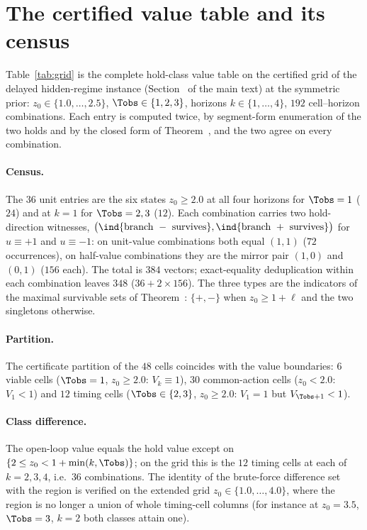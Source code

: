 \section{The certified value table and its census}\label{si:grid}

Table~\ref{tab:grid} is the complete hold-class value table on the certified grid of the delayed hidden-regime instance (Section~ of the main text) at the symmetric prior: $z_0\in\{1.0,\dots,2.5\}$, $\Tobs\in\{1,2,3\}$, horizons $k\in\{1,\dots,4\}$, $192$ cell--horizon combinations. Each entry is computed twice, by segment-form enumeration of the two holds and by the closed form  of Theorem~, and the two agree on every combination.

\begin{table}[h]
\centering\footnotesize
\caption{Hold-class safety value $V^{\hold}_k(b_0)$ on the certified grid at $w=\tfr12$. The value is $1$ exactly when $z_0\ge1+\min(k,\Tobs)$: $36$ unit entries and $156$ half entries.}
\label{tab:grid}
\setlength{\tabcolsep}{4pt}

\end{table}

\paragraph{Census.} The $36$ unit entries are the six states $z_0\ge2.0$ at all four horizons for $\Tobs=1$ ($24$) and at $k=1$ for $\Tobs=2,3$ ($12$). Each combination carries two hold-direction witnesses, $\bigl(\ind{\text{branch }-\text{ survives}},\ind{\text{branch }+\text{ survives}}\bigr)$ for $u\equiv+1$ and $u\equiv-1$: on unit-value combinations both equal $(1,1)$ ($72$ occurrences), on half-value combinations they are the mirror pair $(1,0)$ and $(0,1)$ ($156$ each). The total is $384$ vectors; exact-equality deduplication within each combination leaves $348$ ($36+2\times156$). The three types are the indicators of the maximal survivable sets of Theorem~: $\{+,-\}$ when $z_0\ge1+\ell$ and the two singletons otherwise.

\paragraph{Partition.} The certificate partition of the $48$ cells coincides with the value boundaries: $6$ viable cells ($\Tobs=1$, $z_0\ge2.0$: $V_k\equiv1$), $30$ common-action cells ($z_0<2.0$: $V_1<1$) and $12$ timing cells ($\Tobs\in\{2,3\}$, $z_0\ge2.0$: $V_1=1$ but $V_{\Tobs+1}<1$).

\paragraph{Class difference.} The open-loop value  equals the hold value except on $\{2\le z_0<1+\min(k,\Tobs)\}$; on the grid this is the $12$ timing cells at each of $k=2,3,4$, i.e.\ $36$ combinations. The identity of the brute-force difference set with the region is verified on the extended grid $z_0\in\{1.0,\dots,4.0\}$, where the region is no longer a union of whole timing-cell columns (for instance at $z_0=3.5$, $\Tobs=3$, $k=2$ both classes attain one).
